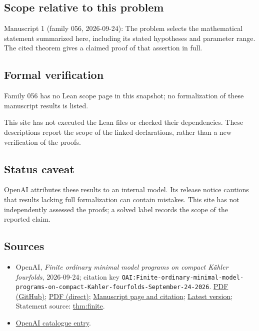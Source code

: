 \documentclass[11pt]{article}
\begin{document}
\subsection{Scope relative to this problem}
Manuscript 1 (family 056, 2026-09-24): The problem selects the mathematical statement summarized here, including its stated hypotheses and parameter range. The cited theorem gives a claimed proof of that assertion in full.

\subsection{Formal verification}
Family 056 has no Lean scope page in this snapshot; no formalization of these manuscript results is listed.

This site has not executed the Lean files or checked their dependencies. These descriptions report the scope of the linked declarations, rather than a new verification of the proofs.

\subsection{Status caveat}
OpenAI attributes these results to an internal model. Its release notice cautions that results lacking full formalization can contain mistakes. This site has not independently assessed the proofs; a solved label records the scope of the reported claim.

\subsection{Sources}
\begin{itemize}
\item OpenAI, \emph{Finite ordinary minimal model programs on compact Kähler fourfolds}, 2026-09-24; citation key \texttt{OAI:Finite-ordinary-minimal-model-programs-on-compact-Kahler-fourfolds-September-24-2026}. \href{https://github.com/openai/math/blob/adc7f1241b42e322a6451854ab7e4b4c146bf78a/preprints/Finite-ordinary-minimal-model-programs-on-compact-Kahler-fourfolds-September-24-2026/paper.pdf}{PDF (GitHub)}; \href{https://github.com/openai/math/raw/adc7f1241b42e322a6451854ab7e4b4c146bf78a/preprints/Finite-ordinary-minimal-model-programs-on-compact-Kahler-fourfolds-September-24-2026/paper.pdf}{PDF (direct)}; \href{https://github.com/openai/math/blob/adc7f1241b42e322a6451854ab7e4b4c146bf78a/preprints/Finite-ordinary-minimal-model-programs-on-compact-Kahler-fourfolds-September-24-2026/README.md}{Manuscript page and citation}; \href{https://github.com/openai/math/blob/main/preprints/Finite-ordinary-minimal-model-programs-on-compact-Kahler-fourfolds-September-24-2026/paper.pdf}{Latest version}; Statement source: \href{https://github.com/openai/math/blob/adc7f1241b42e322a6451854ab7e4b4c146bf78a/preprints/Finite-ordinary-minimal-model-programs-on-compact-Kahler-fourfolds-September-24-2026/build/sections/01-introduction.tex\#L97}{thm:finite}.
\item \href{https://github.com/openai/math/blob/adc7f1241b42e322a6451854ab7e4b4c146bf78a/CONTENTS.md}{OpenAI catalogue entry}.
\end{itemize}
\end{document}

